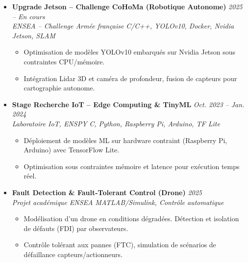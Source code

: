 \documentclass[a4paper,11pt]{article}
\begin{document}
\begin{itemize}[leftmargin=*, label={-}]
\item \textbf{Upgrade Jetson -- Challenge CoHoMa (Robotique Autonome)} \hfill \textit{2025 -- En cours} \\
\textit{ENSEA -- Challenge Armée française} \hfill \textit{C/C++, YOLOv10, Docker, Nvidia Jetson, SLAM}
\vspace{-2pt}
    \begin{itemize}[leftmargin=0.4cm, nosep, label=\tiny$\bullet$]
        \item \small{Optimisation de modèles YOLOv10 embarqués sur Nvidia Jetson sous contraintes CPU/mémoire.}
        \item \small{Intégration Lidar 3D et caméra de profondeur, fusion de capteurs pour cartographie autonome.}
    \end{itemize}
\vspace{3pt}

\item \textbf{Stage Recherche IoT -- Edge Computing \& TinyML} \hfill \textit{Oct. 2023 -- Jan. 2024} \\
\textit{Laboratoire IoT, ENSPY} \hfill \textit{C, Python, Raspberry Pi, Arduino, TF Lite}
\vspace{-2pt}
    \begin{itemize}[leftmargin=0.4cm, nosep, label=\tiny$\bullet$]
        \item \small{Déploiement de modèles ML sur hardware contraint (Raspberry Pi, Arduino) avec TensorFlow Lite.}
        \item \small{Optimisation sous contraintes mémoire et latence pour exécution temps réel.}
    \end{itemize}
\vspace{3pt}

\item \textbf{Fault Detection \& Fault-Tolerant Control (Drone)} \hfill \textit{2025} \\
\textit{Projet académique ENSEA} \hfill \textit{MATLAB/Simulink, Contrôle automatique}
\vspace{-2pt}
    \begin{itemize}[leftmargin=0.4cm, nosep, label=\tiny$\bullet$]
        \item \small{Modélisation d'un drone en conditions dégradées. Détection et isolation de défauts (FDI) par observateurs.}
        \item \small{Contrôle tolérant aux pannes (FTC), simulation de scénarios de défaillance capteurs/actionneurs.}
    \end{itemize}
\vspace{3pt}


\end{itemize}
\end{document}
